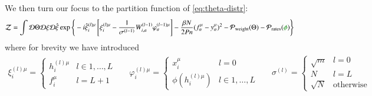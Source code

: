 \documentclass[../main.tex]{subfiles}
\begin{document}
We then turn our focus to the partition function of \eqref{eq:theta-distr}:
\begin{align*}
  \mathcal Z &=
    \int \mathcal{D} \Theta \mathcal{D} \xi \mathcal{D} \hat \xi
    \exp \Bigg \{
      -i \hat \xi^{(l)\mu}_{i} \left[
        \xi^{(l)\mu}_{i} - \frac{1}{\sigma^{(l-1)}} W^{(l-1)}_{i,a} \varphi^{(l-1)\mu}_{a} 
      \right]
      - \frac{\beta N}{2 P n} ( f^{\mu}_{\alpha} - y^{\mu}_{\alpha})^2
      - \mathcal{P}_{\text{weight}}(\Theta)
      - \mathcal{P}_{\text{rates}}(\typo{\phi})
    \Bigg \} 
\end{align*}
where for brevity we have introduced
\begin{align*}
  \xi^{(l)\mu}_{i} = \begin{cases}
    h^{(l)\mu}_{i} & l \in 1, \dots, L \\
    f^{\mu}_i   & l = L+1
  \end{cases}
&&
  \varphi^{(l)\mu}_{i} = \begin{cases}
    x^{\mu}_i         & l =0 \\
    \phi(h^{(l)\mu}_{i}) & l \in 1, \dots, L
  \end{cases}
&& 
  \sigma^{(l)} = \begin{cases}
    \sqrt{m} & l = 0 \\
    N        & l = L \\
    \sqrt{N} & \text{otherwise}
  \end{cases}
\end{align*}
\end{document}
